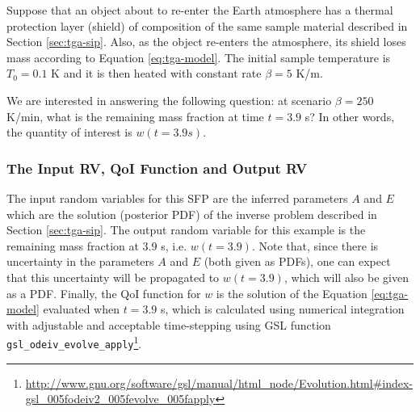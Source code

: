 Suppose that an object about to re-enter the Earth atmosphere has a thermal
protection layer (shield) of composition of the same sample material described
in Section \ref{sec:tga-sip}. Also, as the object re-enters the atmosphere, its
shield loses mass according to Equation \eqref{eq:tga-model}.  The initial
sample temperature is $T_0=0.1$ K and it is then heated with constant rate
$\beta=5$ K/m.

We are interested in answering the following question: at scenario $\beta=250$
K/min, what is the remaining mass fraction at time $t=3.9$ s? In other words,
the quantity of interest is $w(t=3.9s)$.




\subsubsection{The Input RV, QoI Function and Output RV}


The input random variables for this SFP are the inferred parameters $A$ and $E$ which are the solution (posterior PDF) of the inverse problem described in Section \ref{sec:tga-sip}. The output random variable for this example is the remaining mass fraction at 3.9 s, i.e. $w(t=3.9)$. Note that, since there is uncertainty in the parameters $A$ and $E$ (both given as PDFs), one can expect that this uncertainty will be propagated to $w(t=3.9)$, which will also be given as a PDF. Finally, the QoI function for $w$ is the solution of the Equation \eqref{eq:tga-model} evaluated when $t=3.9$ s, which is calculated using numerical integration with adjustable and acceptable time-stepping using GSL function \verb+gsl_odeiv_evolve_apply+\footnote{\url{http://www.gnu.org/software/gsl/manual/html_node/Evolution.html\#index-gsl_005fodeiv2_005fevolve_005fapply}}. 


